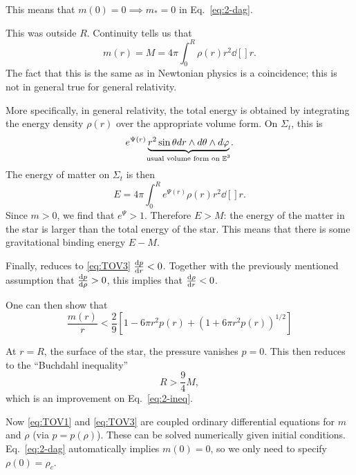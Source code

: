 This means that $m(0) = 0 \implies m_* = 0$ in Eq.~\eqref{eq:2-dag}.

This was outside $R$. Continuity tells us that
\begin{equation}
  m(r) = M = 4 \pi \int_0^R \rho(r) r^2 \dd[]{r} \label{eq:2-star}.
\end{equation}
The fact that this is the same as in Newtonian physics is a coincidence; this is not in general true for general relativity.

More specifically, in general relativity, the total energy is obtained by integrating the energy density $\rho(r)$ over the appropriate volume form. On $\Sigma_t$, this is
 \begin{equation}
  e^{\Psi(r)} \underbrace{r^2 \sin \theta dr \wedge d\theta \wedge d\varphi}_{\mathclap{\text{usual volume form on } \mathbb{E}^3}}.
\end{equation}
The energy of matter on $\Sigma_t$ is then
\begin{equation}
  E = 4 \pi \int_0^R e^{\Psi(r)} \rho(r)r^2 \dd[]{r}.
\end{equation}
Since $m > 0$, we find that $e^{\Psi} > 1$.
Therefore $E > M$: the energy of the matter in the star is larger than the total energy of the star.
This means that there is some gravitational binding energy $E - M$.

Finally, reduces to \eqref{eq:TOV3} $\dv{p}{r} < 0$. Together with the previously mentioned assumption that $\dv{p}{\rho} > 0$, this implies that $\dv{\rho}{r} < 0$.
\begin{exercise}[Sheet 1]
  One can then show that
  \begin{equation}
    \frac{m(r)}{r} < \frac{2}{9} \left[ 1 - 6 \pi r^2 p(r) + (1 + 6 \pi r^2 p(r))^{1 / 2} \right] \label{eq:2-doubstar}
  \end{equation}
\end{exercise}
At $r = R$, the surface of the star, the pressure vanishes $p = 0$. This then reduces to the ``Buchdahl inequality''
\begin{equation}
  \label{eq:buchdahl}
  R > \frac{9}{4} M,
\end{equation}
which is an improvement on Eq.~\eqref{eq:2-ineq}.

Now \eqref{eq:TOV1} and \eqref{eq:TOV3} are coupled ordinary differential equations for $m$ and $\rho$ (via $p = p(\rho)$).
These can be solved numerically given initial conditions. Eq.~\eqref{eq:2-dag} automatically implies $m(0) = 0 $, so we only need to specify $\rho(0) = \rho_c$.

